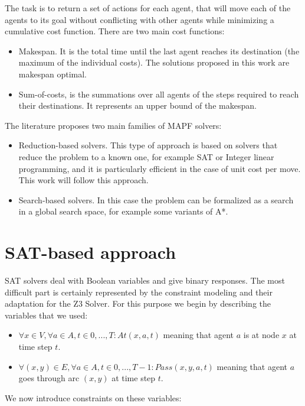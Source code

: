 \documentclass[12pt, a4paper, hidelinks]{article}
\numberwithin{equation}{section}
\begin{document}
The task is to return a set of actions for each agent, that will move each of the agents to its goal without conflicting with other agents while minimizing a cumulative cost function. 
There are two main cost functions:

\begin{itemize}
\item Makespan. 
It is the total time until the last agent reaches its destination (the maximum of the individual costs).
The solutions proposed in this work are makespan optimal.
\item Sum-of-costs, is the summations over all agents of the steps required to reach their destinations. 
It represents an upper bound of the makespan.
\end{itemize}

The literature proposes two main families of MAPF solvers:

\begin{itemize}
\item Reduction-based solvers.
This type of approach is based on solvers that reduce the problem to a known one, for example SAT or Integer linear programming, and it is particularly efficient in the case of unit cost per move.
This work will follow this approach.
\item Search-based solvers.
In this case the problem can be formalized as a search in a global search space, for example some variants of A*.
\end{itemize}

\section{SAT-based approach}\label{sec:sat-based-approach}
SAT solvers deal with Boolean variables and give binary responses.
The most difficult part is certainly represented by the constraint modeling and their adaptation for the Z3 Solver.
For this purpose we begin by describing the variables that we used:

\begin{itemize}
\item $\forall x \in V, \forall a \in A, t \in {0, ..., T} : At(x, a, t)$ meaning that agent $a$ is at node $x$ at time step $t$.
\item $\forall(x, y)\in E, \forall a \in A, t \in {0, ..., T-1} : Pass(x, y, a, t)$ meaning that agent $a$ goes through arc $(x, y)$ at time step $t$. 
\end{itemize}

We now introduce constraints on these variables:
\end{document}
